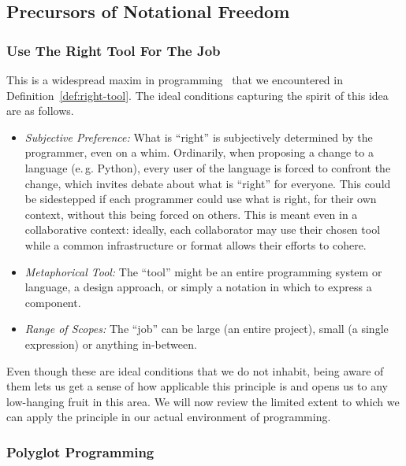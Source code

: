 \documentclass[ twoside,openright,titlepage,numbers=noenddot,headinclude,footinclude,cleardoublepage=empty,abstract=on,
                BCOR=5mm,paper=a4,fontsize=11pt
                ]{scrreprt}
\newcommand{\eg}{e.\,g.}
\newcommand{\RTFJ}{Right Tool For The Job}
\newcommand{\URTFJ}{Use The \RTFJ}
\providecommand{\tightlist}{}\newenvironment{longtable}[2]{\begin{tabular}}{\end{tabular}}
\theoremstyle{definition}
\begin{document}
\hypertarget{precursors-of-notational-freedom}{\subsection{Precursors of Notational
Freedom}\label{precursors-of-notational-freedom}}

\hypertarget{section}{\subsubsection{\texorpdfstring{\URTFJ}{}}\label{section}}

This is a widespread maxim in programming~\parencite{RightTool} that we
encountered in Definition~\ref{def:right-tool}. The ideal conditions
capturing the spirit of this idea are as follows.

\begin{itemize}
\tightlist
\item
  \emph{Subjective Preference:} What is ``right'' is subjectively
  determined by the programmer, even on a whim. Ordinarily, when
  proposing a change to a language (\eg{} Python), every user of the
  language is forced to confront the change, which invites debate about
  what is ``right'' for everyone. This could be sidestepped if each
  programmer could use what is right, for their own context, without
  this being forced on others. This is meant even in a collaborative
  context: ideally, each collaborator may use their chosen tool while a
  common infrastructure or format allows their efforts to cohere.
\item
  \emph{Metaphorical Tool:} The ``tool'' might be an entire programming
  system or language, a design approach, or simply a notation in which
  to express a component.
\item
  \emph{Range of Scopes:} The ``job'' can be large (an entire project),
  small (a single expression) or anything in-between.
\end{itemize}

Even though these are ideal conditions that we do not inhabit, being
aware of them lets us get a sense of how applicable this principle is
and opens us to any low-hanging fruit in this area. We will now review
the limited extent to which we can apply the principle in our actual
environment of programming.

\hypertarget{polyglot-programming}{\subsubsection{Polyglot Programming}\label{polyglot-programming}}
\end{document}
